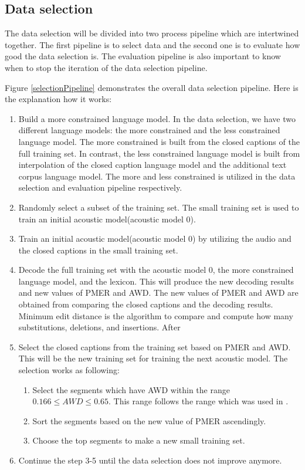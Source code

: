 \subsection{Data selection}
\label{ch3:dataselection}
The data selection will be divided into two process pipeline which are intertwined together. The first pipeline is to select data and the second one is to evaluate how good the data selection is. The evaluation pipeline is  also important to know when to stop the iteration of the data selection pipeline.   

Figure \ref{selectionPipeline} demonstrates the overall data selection pipeline. Here is the explanation how it works:
\begin{enumerate}
\item Build a more constrained language model. In the data selection, we have two different language models: the more constrained and  the less constrained language model. The more constrained is built from the closed captions of the full training set. In contrast, the less constrained language model is built from interpolation of the closed caption language model and the additional text corpus language model. The more and less constrained is utilized in the data selection and evaluation pipeline respectively.
\item Randomly select a subset of the training set. The small training set is used to train an initial acoustic model(acoustic model 0). 
\item Train an initial acoustic model(acoustic model 0) by utilizing the audio and the closed captions in the small training set. 
\item Decode the full training set with the acoustic model 0, the more constrained language model, and the lexicon. This will produce the new decoding results and new values of PMER and AWD.  The new values of PMER and AWD are obtained from comparing the closed captions and the decoding results.  Minimum edit distance is the algorithm to compare and compute how many substitutions, deletions, and insertions. After 

\item Select the closed captions from the training set based on PMER and AWD. This will be the new training set for training the next acoustic model. The selection works as following:
	\begin{enumerate}
	\item Select the segments which have AWD within the range $0.166 \le AWD \le 0.65$. This range follows the range which was used in \cite{Lanchantin2016}.
	\item Sort the segments based on the new value of PMER ascendingly. 
	\item Choose the top segments to make a new small training set.
	\end{enumerate}
\item Continue the step 3-5 until the data selection does not improve anymore. 
\end{enumerate}


